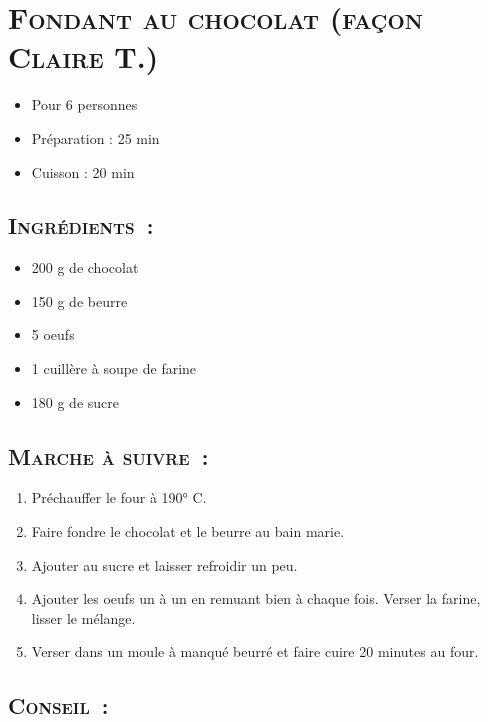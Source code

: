 \section[\normalsize{Fondant au chocolat (fa\c con Claire T.)}]{\LARGE{\textsc{Fondant au chocolat (fa\c con Claire T.)}}}		%


\begin{itemize}
\item Pour 6 personnes
\item Préparation : 25 min
\item Cuisson : 20 min
\end{itemize}

\subsection*{\textsc{Ingr\'edients~:}}

\begin{itemize}

\item 200 g de chocolat
\item 150 g de beurre
\item 5 oeufs
\item 1 cuill\`ere \`a soupe de farine
\item 180 g de sucre
\end{itemize}


\subsection*{\textsc{Marche \`a suivre~:}}

\begin{enumerate}
\item Pr\'echauffer le four \`a 190° C.
\item Faire fondre le chocolat et le beurre au bain marie. 
\item Ajouter au sucre et laisser refroidir un peu. 
\item Ajouter les oeufs un \`a un en remuant bien \`a chaque fois. Verser la farine, lisser le m\'elange.
\item Verser dans un moule \`a manqu\'e beurr\'e et faire cuire 20 minutes au four.

\end{enumerate}
\subsection*{\textsc{Conseil~:}}
